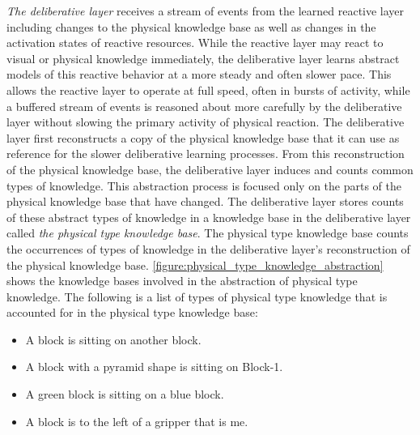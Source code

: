 \emph{The deliberative layer} receives a stream of events from the
learned reactive layer including changes to the physical knowledge
base as well as changes in the activation states of reactive
resources.  While the reactive layer may react to visual or physical
knowledge immediately, the deliberative layer learns abstract models
of this reactive behavior at a more steady and often slower pace.
This allows the reactive layer to operate at full speed, often in
bursts of activity, while a buffered stream of events is reasoned
about more carefully by the deliberative layer without slowing the
primary activity of physical reaction.  The deliberative layer first
reconstructs a copy of the physical knowledge base that it can use as
reference for the slower deliberative learning processes.  From this
reconstruction of the physical knowledge base, the deliberative layer
induces and counts common types of knowledge.  This abstraction
process is focused only on the parts of the physical knowledge base
that have changed.  The deliberative layer stores counts of these
abstract types of knowledge in a knowledge base in the deliberative
layer called \emph{the physical type knowledge base}.  The physical
type knowledge base counts the occurrences of types of knowledge in
the deliberative layer's reconstruction of the physical knowledge
base.  {\mbox{\autoref{figure:physical_type_knowledge_abstraction}}}
shows the knowledge bases involved in the abstraction of physical type
knowledge.  The following is a list of types of physical type
knowledge that is accounted for in the physical type knowledge base:
\begin{itemize}
\item A block is sitting on another block.
\item A block with a pyramid shape is sitting on Block-1.
\item A green block is sitting on a blue block.
\item A block is to the left of a gripper that is me.
\end{itemize}
